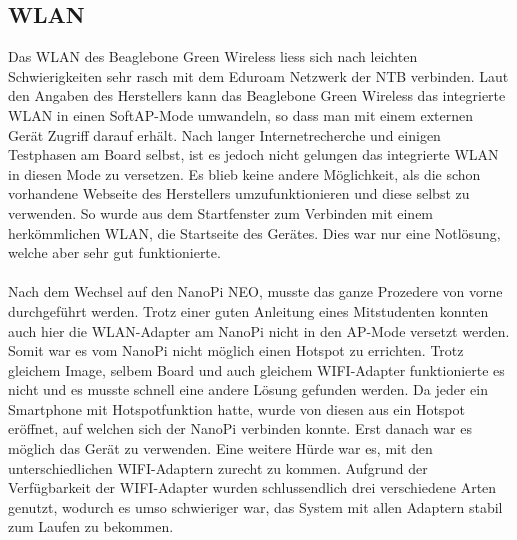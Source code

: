\subsection{WLAN}
Das WLAN des Beaglebone Green Wireless liess sich nach leichten Schwierigkeiten sehr rasch mit dem Eduroam Netzwerk der NTB verbinden. Laut den Angaben des Herstellers kann das Beaglebone Green Wireless das integrierte WLAN in einen SoftAP-Mode umwandeln, so dass man mit einem externen Gerät Zugriff darauf erhält. Nach langer Internetrecherche und einigen Testphasen am Board selbst, ist es jedoch nicht gelungen das integrierte WLAN in diesen Mode zu versetzen. Es blieb keine andere Möglichkeit, als die schon vorhandene Webseite des Herstellers umzufunktionieren und diese selbst zu verwenden. So wurde aus dem Startfenster zum Verbinden mit einem herkömmlichen WLAN, die Startseite des Gerätes. Dies war nur eine Notlösung, welche aber sehr gut funktionierte.\\\\
Nach dem Wechsel auf den NanoPi NEO, musste das ganze Prozedere von vorne durchgeführt werden. Trotz einer guten Anleitung eines Mitstudenten konnten auch hier die WLAN-Adapter am NanoPi nicht in den AP-Mode versetzt werden. Somit war es vom NanoPi nicht möglich einen Hotspot zu errichten. Trotz gleichem Image, selbem Board und auch gleichem WIFI-Adapter funktionierte es nicht und es musste schnell eine andere Lösung gefunden werden. Da jeder ein Smartphone mit Hotspotfunktion hatte, wurde von diesen aus ein Hotspot eröffnet, auf welchen sich der NanoPi verbinden konnte. Erst danach war es möglich das Gerät zu verwenden. Eine weitere Hürde war es, mit den unterschiedlichen WIFI-Adaptern zurecht zu kommen. Aufgrund der Verfügbarkeit der WIFI-Adapter wurden schlussendlich drei verschiedene Arten genutzt, wodurch es umso schwieriger war, das System mit allen Adaptern stabil zum Laufen zu bekommen.
